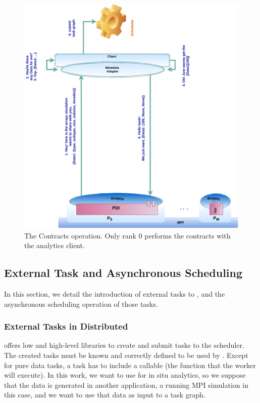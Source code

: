 \begin{figure}[h!]\centering
\includegraphics[scale=0.45,  angle=-90]{figures/Contracts .pdf}
\caption{The Contracts operation. Only rank 0 performs the contracts with the analytics client.}
\label{figcontracts}
\end{figure}

\subsection{External Task and Asynchronous Scheduling}
In this section, we detail the introduction of external tasks to \dask, and the asynchronous scheduling operation of those tasks. 

\subsubsection{External Tasks in \dask Distributed}\label{sec:externaltasks}

\dask offers low and high-level libraries to create and submit tasks to the scheduler. The created tasks must be known and correctly defined to be used by \dask. Except for pure data tasks, a task has to include a callable (the function that the worker will execute). In this work, we want to use \dask for in situ analytics, so we suppose that the data is generated in another application, a running MPI simulation in this case, and we want to use that data as input to a \dask task graph. 

